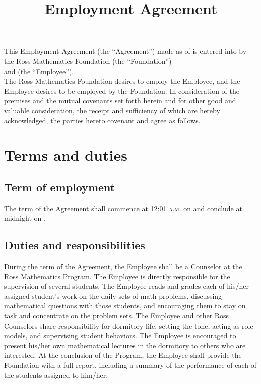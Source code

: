 \documentclass{ross}
\title{Employment Agreement}
\begin{document}
\maketitle

This Employment Agreement (the ``Agreement'') made as of  is
entered into by the Ross Mathematics Foundation (the ``Foundation'') \\
and  (the ``Employee'').\\

The Ross Mathematics Foundation desires to employ the Employee, and
the Employee desires to be employed by the Foundation.  
In consideration of the premises and the mutual covenants
set forth herein and for other good and valuable consideration, the
receipt and sufficiency of which are hereby acknowledged, the parties
hereto covenant and agree as follows.

\section{Terms and duties}

\subsection{Term of employment}

The term of the Agreement shall commence at 12:01 \textsc{a.m.} on 
 and conclude at midnight on
.

\subsection{Duties and responsibilities}

During the term of the Agreement, the Employee shall be a Counselor at
the Ross Mathematics Program.  The Employee is directly responsible
for the supervision of several students.  The Employee reads and
grades each of his/her assigned student's work on the daily sets of
math problems, discussing mathematical questions with those students,
and encouraging them to stay on task and concentrate on the problem
sets.  The Employee and other Ross Counselors share responsibility for dormitory life, setting the
tone, acting as role models, and supervising student behaviors.  The
Employee is encouraged to present his/her own mathematical lectures in
the dormitory to others who are interested.  At the
conclusion of the Program, the Employee shall
provide the Foundation with a full report, including a summary of the performance of
each of the students assigned to him/her.
\end{document}
